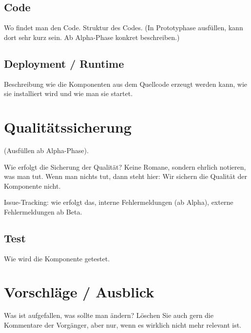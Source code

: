 \subsection{Code}
Wo findet man den Code. Struktur des Codes. (In Prototyphase ausfüllen,
kann dort sehr kurz sein. Ab Alpha-Phase konkret beschreiben.)

\subsection{Deployment / Runtime}
Beschreibung wie die Komponenten aus dem Quellcode erzeugt werden kann,
wie sie installiert wird und wie man sie startet.

\section{Qualitätssicherung}
(Ausfüllen ab Alpha-Phase).

Wie erfolgt die Sicherung der Qualität? Keine Romane, sondern ehrlich notieren,
was man tut. Wenn man nichts tut, dann steht hier: Wir sichern die Qualität der
Komponente nicht.

Issue-Tracking: wie erfolgt das, interne Fehlermeldungen (ab Alpha), 
externe Fehlermeldungen ab Beta.

\subsection{Test}
Wie wird die Komponente getestet.

\section{Vorschläge / Ausblick}
Was ist aufgefallen, was sollte man ändern? Löschen Sie auch gern die Kommentare
der Vorgänger, aber nur, wenn es wirklich nicht mehr relevant ist.


